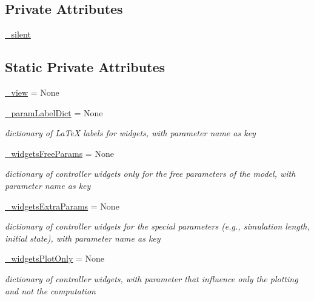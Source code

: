 \subsection*{Private Attributes}
\begin{DoxyCompactItemize}
\item 
\hyperlink{class_mu_mo_t_1_1_mu_mo_t_1_1_mu_mo_tcontroller_a909146a3c119c927727c7d533042b184}{\+\_\+silent}
\end{DoxyCompactItemize}
\subsection*{Static Private Attributes}
\begin{DoxyCompactItemize}
\item 
\hyperlink{class_mu_mo_t_1_1_mu_mo_t_1_1_mu_mo_tcontroller_a27dd8543b5188cdfe40f622d267fe2c5}{\+\_\+view} = None
\item 
\hyperlink{class_mu_mo_t_1_1_mu_mo_t_1_1_mu_mo_tcontroller_a13bcda33e0e971cf4ad2710945226add}{\+\_\+param\+Label\+Dict} = None
\begin{DoxyCompactList}\small\item\em dictionary of La\+TeX labels for widgets, with parameter name as key \end{DoxyCompactList}\item 
\hyperlink{class_mu_mo_t_1_1_mu_mo_t_1_1_mu_mo_tcontroller_aab884266838b2bf42f4ff27cc2041464}{\+\_\+widgets\+Free\+Params} = None
\begin{DoxyCompactList}\small\item\em dictionary of controller widgets only for the free parameters of the model, with parameter name as key \end{DoxyCompactList}\item 
\hyperlink{class_mu_mo_t_1_1_mu_mo_t_1_1_mu_mo_tcontroller_aae2fc2e1d31d0fd22ea078bb930222a4}{\+\_\+widgets\+Extra\+Params} = None
\begin{DoxyCompactList}\small\item\em dictionary of controller widgets for the special parameters (e.\+g., simulation length, initial state), with parameter name as key \end{DoxyCompactList}\item 
\hyperlink{class_mu_mo_t_1_1_mu_mo_t_1_1_mu_mo_tcontroller_af54e883f58d2be155299935e0bf427cb}{\+\_\+widgets\+Plot\+Only} = None
\begin{DoxyCompactList}\small\item\em dictionary of controller widgets, with parameter that influence only the plotting and not the computation \end{DoxyCompactList}\item 

\end{DoxyCompactItemize}
